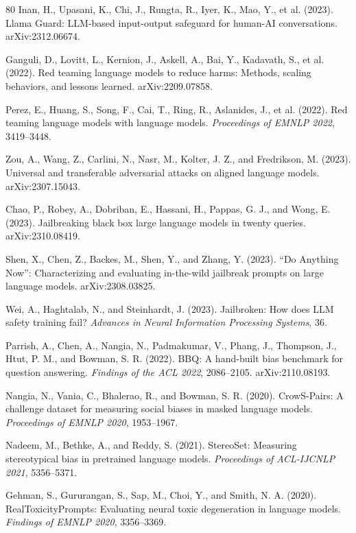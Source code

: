 \documentclass[11pt,a4paper]{article}
\begin{document}
\begin{thebibliography}{80}
Inan, H., Upasani, K., Chi, J., Rungta, R., Iyer, K., Mao, Y., et al. (2023). Llama Guard: LLM-based input-output safeguard for human-AI conversations. arXiv:2312.06674.

Ganguli, D., Lovitt, L., Kernion, J., Askell, A., Bai, Y., Kadavath, S., et al. (2022). Red teaming language models to reduce harms: Methods, scaling behaviors, and lessons learned. arXiv:2209.07858.

Perez, E., Huang, S., Song, F., Cai, T., Ring, R., Aslanides, J., et al. (2022). Red teaming language models with language models. \textit{Proceedings of EMNLP 2022}, 3419--3448.

Zou, A., Wang, Z., Carlini, N., Nasr, M., Kolter, J. Z., and Fredrikson, M. (2023). Universal and transferable adversarial attacks on aligned language models. arXiv:2307.15043.

Chao, P., Robey, A., Dobriban, E., Hassani, H., Pappas, G. J., and Wong, E. (2023). Jailbreaking black box large language models in twenty queries. arXiv:2310.08419.

Shen, X., Chen, Z., Backes, M., Shen, Y., and Zhang, Y. (2023). ``Do Anything Now'': Characterizing and evaluating in-the-wild jailbreak prompts on large language models. arXiv:2308.03825.

Wei, A., Haghtalab, N., and Steinhardt, J. (2023). Jailbroken: How does LLM safety training fail? \textit{Advances in Neural Information Processing Systems}, 36.

Parrish, A., Chen, A., Nangia, N., Padmakumar, V., Phang, J., Thompson, J., Htut, P. M., and Bowman, S. R. (2022). BBQ: A hand-built bias benchmark for question answering. \textit{Findings of the ACL 2022}, 2086--2105. arXiv:2110.08193.

Nangia, N., Vania, C., Bhalerao, R., and Bowman, S. R. (2020). CrowS-Pairs: A challenge dataset for measuring social biases in masked language models. \textit{Proceedings of EMNLP 2020}, 1953--1967.

Nadeem, M., Bethke, A., and Reddy, S. (2021). StereoSet: Measuring stereotypical bias in pretrained language models. \textit{Proceedings of ACL-IJCNLP 2021}, 5356--5371.

Gehman, S., Gururangan, S., Sap, M., Choi, Y., and Smith, N. A. (2020). RealToxicityPrompts: Evaluating neural toxic degeneration in language models. \textit{Findings of EMNLP 2020}, 3356--3369.


\end{thebibliography}
\end{document}
